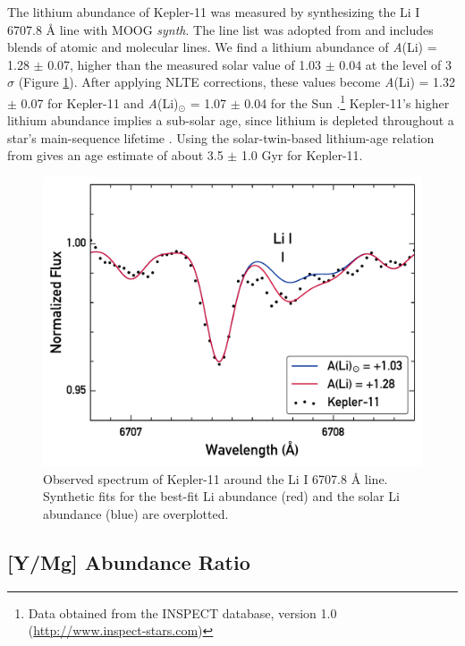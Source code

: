 \documentclass[twocolumn]{aastex61}
\begin{document}
The lithium abundance of Kepler-11 was measured by synthesizing the Li I 6707.8 \r{A} line with MOOG \textit{synth}. The line list was adopted from \citet{Melendez2012} and includes blends of atomic and molecular lines. We find a lithium abundance of \textit{A}(Li) = 1.28 $\pm$ 0.07, higher than the measured solar value of 1.03 $\pm$ 0.04 at the level of 3$\sigma$ (Figure \ref{fig:lithium}). After applying NLTE corrections, these values become \textit{A}(Li) = 1.32 $\pm$ 0.07 for Kepler-11 and \textit{A}(Li)$_{\odot}$ = 1.07 $\pm$ 0.04 for the Sun \citep{Lind2009}.\footnote{Data obtained from the INSPECT database, version 1.0 (\url{http://www.inspect-stars.com})} Kepler-11's higher lithium abundance implies a sub-solar age, since lithium is depleted throughout a star's main-sequence lifetime \citep{Duncan1981}. Using the solar-twin-based lithium-age relation from \citet{Carlos2016} gives an age estimate of about 3.5 $\pm$ 1.0 Gyr for Kepler-11.

\begin{figure}
\centering
\includegraphics[width=\columnwidth]{lithium}
\caption{Observed spectrum of Kepler-11 around the Li I 6707.8 \r{A} line. Synthetic fits for the best-fit Li abundance (red) and the solar Li abundance (blue) are overplotted.}
\label{fig:lithium}
\end{figure}

\vspace{8mm}


\subsection{[Y/Mg] Abundance Ratio}
\end{document}
